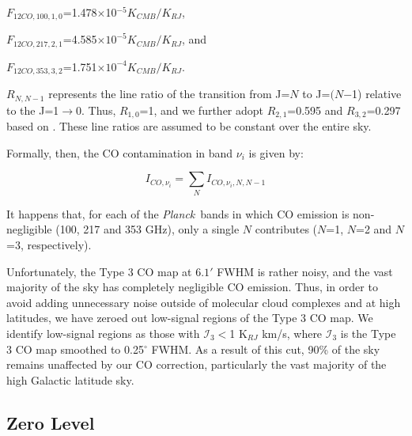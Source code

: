 \documentclass{emulateapj}
\newcommand{\PLANCK}{{\it Planck}}
\begin{document}
\noindent
$F_{12CO, 100, 1, 0}$=1.478$\times$10$^{-5}$$K_{CMB}/K_{RJ}$,

\noindent
$F_{12CO, 217, 2, 1}$=4.585$\times$$10^{-5}$$K_{CMB}/K_{RJ}$, and 

\noindent
$F_{12CO, 353, 3, 2}$=1.751$\times$$10^{-4}$$K_{CMB}/K_{RJ}$.

\noindent
$R_{N, N-1}$ represents the line ratio of the transition from J=$N$ to 
J=$(N$$-$1) relative to the J=1$\rightarrow$0. Thus, $R_{1,0}$=1, and we 
further adopt $R_{2,1}$=0.595 and $R_{3,2}$=0.297 based on \cite{planckco}. 
These line ratios are assumed to be constant over the entire sky. 

Formally, then, the CO contamination in band $\nu_i$ is given by:


\begin{equation}
I_{CO, \nu_i} = \sum\limits_{N} I_{CO, \nu_i, N, N-1}
\end{equation}

It happens that, for each of the \PLANCK~bands in which CO emission is
non-negligible (100, 217 and 353 GHz), only a single $N$ contributes ($N$=1, 
$N$=2 and $N$=3, respectively). 

Unfortunately, the Type 3 CO map at $6.1'$ FWHM is rather noisy, and the vast
majority of the sky has completely negligible CO emission. Thus, in order to 
avoid adding unnecessary noise outside of molecular cloud complexes and at high
latitudes, we have zeroed out low-signal regions of the Type 3 CO map. We 
identify  low-signal regions as those with $\mathcal{I}_3$$<$1 K$_{RJ}$ km/s, 
where $\mathcal{I}_3$ is the Type 3 CO map smoothed to 0.25$^{\circ}$ FWHM. As 
a result of this cut, 90\% of the sky remains unaffected by our CO correction, 
particularly the vast majority of the high Galactic latitude sky.



\subsection{Zero Level}
\label{sec:zp}
\end{document}
